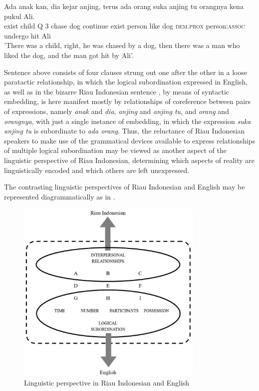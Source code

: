 \documentclass[output=paper,colorlinks,citecolor=brown
]{langscibook}
\begin{document}
\ea \label{ex:gil:9}
\gll Ada	anak	kan,	dia	kejar	anjing,	terus	ada	orang	suka	anjing	tu orangnya	kena	pukul	Ali. \\
    exist	child	Q	3	chase	dog	continue	exist	person	like	dog \textsc{dem.prox} person:\textsc{assoc}	undergo	hit	Ali\\
\glt 		'There was a child, right, he was chased by a dog, then there was a man who liked the dog, and the man got hit by Ali'.
\z

Sentence  above consists of four clauses strung out one after the other in a loose paratactic relationship, in which the logical subordination expressed in English, as well as in the bizarre Riau Indonesian sentence , by means of syntactic embedding, is here manifest mostly by relationships of coreference between pairs of expressions, namely \textit{anak} and \textit{dia}, \textit{anjing} and \textit{anjing tu}, and \textit{orang} and \textit{orangnya}, with just a single instance of embedding, in which the expression \textit{suka anjing tu} is subordinate to \textit{ada orang}.  Thus, the reluctance of Riau Indonesian speakers to make use of the grammatical devices available to express relationships of multiple logical subordination may be viewed as another aspect of the linguistic perspective of Riau Indonesian, determining which aspects of reality are linguistically encoded and which others are left unexpressed.

The contrasting linguistic perspectives of Riau Indonesian and English may be represented diagrammatically as in .

\begin{figure}
\centering
\includegraphics[width=0.8\textwidth]{gil_figure4.png}
\caption{\label{fig:gil:fig4}Linguistic perspective in Riau Indonesian and English}
\end{figure}
\end{document}
